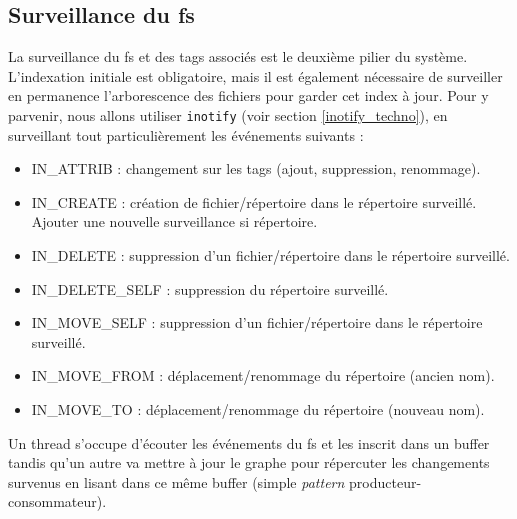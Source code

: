 \subsection{Surveillance du \acrshort{fs}}
La surveillance du \acrshort{fs} et des tags associés est le deuxième pilier du système. 
L'indexation initiale est obligatoire, mais il est également nécessaire de surveiller en permanence 
l'arborescence des fichiers pour garder cet index à jour. Pour y parvenir, nous allons utiliser 
\texttt{inotify} (voir section \ref{inotify_techno}), en surveillant tout particulièrement les événements 
suivants :
\begin{itemize}
    \item IN\_ATTRIB : changement sur les tags (ajout, suppression, renommage).
    \item IN\_CREATE : création de fichier/répertoire dans le répertoire surveillé. Ajouter une nouvelle surveillance si répertoire.
    \item IN\_DELETE : suppression d'un fichier/répertoire dans le répertoire surveillé.
    \item IN\_DELETE\_SELF : suppression du répertoire surveillé.
    \item IN\_MOVE\_SELF : suppression d'un fichier/répertoire dans le répertoire surveillé.
    \item IN\_MOVE\_FROM : déplacement/renommage du répertoire (ancien nom).
    \item IN\_MOVE\_TO : déplacement/renommage du répertoire (nouveau nom).
\end{itemize}
Un thread s'occupe d'écouter les événements du \acrshort{fs} et les inscrit dans un buffer 
tandis qu'un autre va mettre à jour le graphe pour répercuter les changements survenus en lisant 
dans ce même buffer (simple \textit{pattern} producteur-consommateur).

